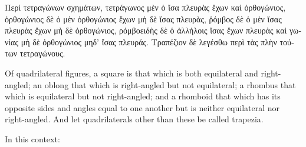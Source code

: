 
\begin{defin}
\textgreek{Περὶ τετραγώνων σχημάτων, τετράγωνος μὲν ὁ ἴσα πλευρὰς ἔχων καὶ ὀρθογώνιος, ὀρθογώνιος δὲ ὁ μὲν ὀρθογώνιος ἔχων μὴ δὲ ἴσας πλευρὰς, ῥόμβος δὲ ὁ μὲν ἴσας πλευρὰς ἔχων μὴ δὲ ὀρθογώνιος, ρόμβοειδὴς δὲ ὁ ἀλλήλοις ἴσας ἔχων πλευρὰς καὶ γωνίας μὴ δὲ ὀρθογώνιος μηδ' ἴσας πλευράς. Τραπέζιον δὲ λεγέσθω περὶ τὰς πλὴν τούτων τετραγώνους.}

Of quadrilateral figures, a square is that which is both equilateral and right-angled; an oblong that which is right-angled but not equilateral; a rhombus that which is equilateral but not right-angled; and a rhomboid that which has its opposite sides and angles equal to one another but is neither equilateral nor right-angled. And let quadrilaterals other than these be called trapezia.
\end{defin}

In this context:

